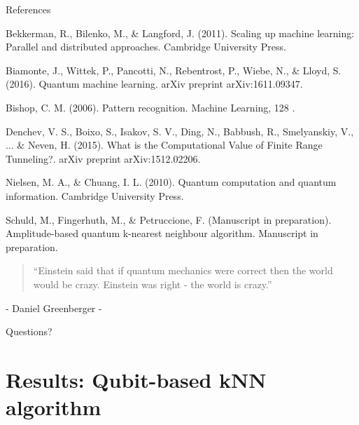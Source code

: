 \documentclass[10pt]{beamer}
\begin{document}
\begin{frame}{References}

\footnotesize{Bekkerman, R., Bilenko, M., \& Langford, J. (2011). Scaling up machine learning: Parallel and distributed
approaches. Cambridge University Press.

Biamonte, J., Wittek, P., Pancotti, N., Rebentrost, P., Wiebe, N., \& Lloyd, S. (2016). Quantum
machine learning. arXiv preprint arXiv:1611.09347.

Bishop, C. M. (2006). Pattern recognition. Machine Learning, 128 .

Denchev, V. S., Boixo, S., Isakov, S. V., Ding, N., Babbush, R., Smelyanskiy, V., ... \& Neven, H. (2015). What is the Computational Value of Finite Range Tunneling?. arXiv preprint arXiv:1512.02206.

Nielsen, M. A., \& Chuang, I. L. (2010). Quantum computation and quantum information. Cambridge University Press.

Schuld, M., Fingerhuth, M., \& Petruccione, F. (Manuscript in preparation). Amplitude-based quantum k-nearest neighbour algorithm. Manuscript in preparation.

}
\end{frame}

\begin{frame}
\begin{quote}
    “Einstein said that if quantum mechanics were correct then the world would be crazy. Einstein was right - the world is crazy.”
  \end{quote}
  \centering
  - Daniel Greenberger - 
\end{frame}

\begin{frame}[standout]
  Questions?
\end{frame}

\section{Results: Qubit-based kNN algorithm}

{
\begin{frame}[fragile]{}




\end{frame}
}
\end{document}
